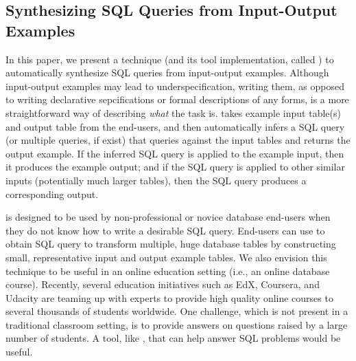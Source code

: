 \subsection{Synthesizing SQL Queries from Input-Output Examples}


In this paper, we present a technique (and its tool
implementation, called \ourtool) to automatically synthesize SQL queries
from input-output examples. Although input-output examples may lead to
underspecification, writing them, as opposed to writing
declarative sepcifications or formal descriptions of any forms,
is a more straightforward way of describing \textit{what} the
task is. \ourtool takes example input
table(s) and output table from the end-users, and then automatically
infers a SQL query (or multiple queries, if exist) that queries
against the input tables and returns the output example. If the inferred
SQL query is applied
to the example input, then it produces the example output; and if the
SQL query is applied to other similar inputs (potentially much larger tables),
then the SQL query produces a corresponding output.




\ourtool is designed to be used by non-professional or novice database
end-users when they do not know how
to write a desirable SQL query. 
End-users can use \ourtool to obtain SQL query to transform
multiple, huge database tables by constructing small, representative
input and output example tables. 
We also envision this technique to be useful in an online education
setting (i.e., an online database course). Recently, several
education initiatives such as EdX, Coursera,
and Udacity are teaming up with experts to provide
high quality online courses
to several thousands of students worldwide.
One challenge, which is not present in a traditional classroom
setting, is to provide answers on questions raised by a large
number of students. A tool, like \ourtool,
that can help answer SQL problems would be useful.



